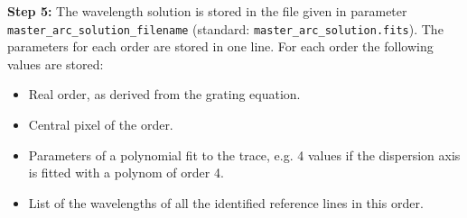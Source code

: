 \documentclass[10pt,a4paper]{article}
\begin{document}
\noindent \textbf{Step 5:} The wavelength solution is stored in the file given in parameter \verb|master_arc_solution_filename| (standard: \verb|master_arc_solution.fits|). The parameters for each order are stored in one line. For each order the following values are stored:
\begin{itemize}
  \item Real order, as derived from the grating equation.
  \item Central pixel of the order.
  \item Parameters of a polynomial fit to the trace, e.g. 4 values if the dispersion axis is fitted with a polynom of order 4.
  \item List of the wavelengths of all the identified reference lines in this order.
\end{itemize}
\end{document}
